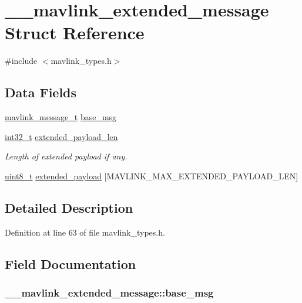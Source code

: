 \hypertarget{struct____mavlink__extended__message}{\section{\-\_\-\-\_\-mavlink\-\_\-extended\-\_\-message Struct Reference}
\label{struct____mavlink__extended__message}
}


{\ttfamily \#include $<$mavlink\-\_\-types.\-h$>$}

\subsection*{Data Fields}
\begin{DoxyCompactItemize}
\item 
\hyperlink{mavlink__types_8h_a63b963764c09dc72f4910c1521e325b9}{mavlink\-\_\-message\-\_\-t} \hyperlink{struct____mavlink__extended__message_a52d142dbcf71540bfc8199b45f676126}{base\-\_\-msg}
\item 
\hyperlink{group___n_a_m_e_gafd12020da5a235dfcf0c3c748fb5baed}{int32\-\_\-t} \hyperlink{struct____mavlink__extended__message_a7fcf54d2c29dc157a78caacae8d998cf}{extended\-\_\-payload\-\_\-len}
\begin{DoxyCompactList}\small\item\em Length of extended payload if any. \end{DoxyCompactList}\item 
\hyperlink{stdint_8h_aba7bc1797add20fe3efdf37ced1182c5}{uint8\-\_\-t} \hyperlink{struct____mavlink__extended__message_afccf6dc3341050b0a63ac0d069d66a31}{extended\-\_\-payload} \mbox{[}M\-A\-V\-L\-I\-N\-K\-\_\-\-M\-A\-X\-\_\-\-E\-X\-T\-E\-N\-D\-E\-D\-\_\-\-P\-A\-Y\-L\-O\-A\-D\-\_\-\-L\-E\-N\mbox{]}
\end{DoxyCompactItemize}


\subsection{Detailed Description}


Definition at line 63 of file mavlink\-\_\-types.\-h.



\subsection{Field Documentation}
\hypertarget{struct____mavlink__extended__message_a52d142dbcf71540bfc8199b45f676126}{
\subsubsection[{base\-\_\-msg}]{ \-\_\-\-\_\-mavlink\-\_\-extended\-\_\-message\-::base\-\_\-msg}}\label{struct____mavlink__extended__message_a52d142dbcf71540bfc8199b45f676126}


